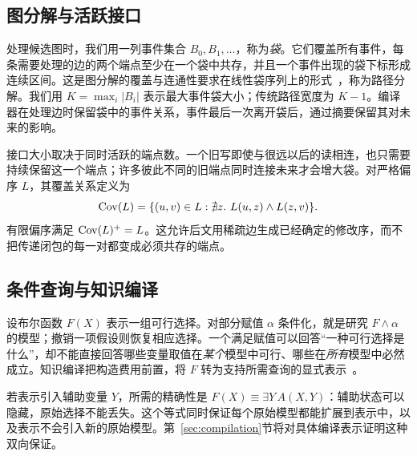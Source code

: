 \subsection{图分解与活跃接口}
处理候选图时，我们用一列事件集合 $B_0,B_1,\ldots$，称为\emph{袋}。它们覆盖所有事件，每条需要处理的边的两个端点至少在一个袋中共存，并且一个事件出现的袋下标形成连续区间。这是图分解的覆盖与连通性要求在线性袋序列上的形式~\cite[§3.1]{conrado2026}，称为路径分解。我们用 $K=\max_i|B_i|$ 表示最大事件袋大小；传统路径宽度为 $K-1$。编译器在处理边时保留袋中的事件关系，事件最后一次离开袋后，通过摘要保留其对未来的影响。

接口大小取决于同时活跃的端点数。一个旧写即使与很远以后的读相连，也只需要持续保留这一个端点；许多彼此不同的旧端点同时连接未来才会增大袋。对严格偏序 $L$，其覆盖关系定义为
\[
 \Cov(L)=\{(u,v)\in L:\nexists z.\ L(u,z)\land L(z,v)\}.
\]
有限偏序满足 $\operatorname{Cov}(L)^+=L$。这允许后文用稀疏边生成已经确定的修改序，而不把传递闭包的每一对都变成必须共存的端点。

\subsection{条件查询与知识编译}
设布尔函数 $F(X)$ 表示一组可行选择。对部分赋值 $\alpha$ 条件化，就是研究 $F\land\alpha$ 的模型；撤销一项假设则恢复相应选择。一个满足赋值可以回答“一种可行选择是什么”，却不能直接回答哪些变量取值在\emph{某个}模型中可行、哪些在\emph{所有}模型中必然成立。知识编译把构造费用前置，将 $F$ 转为支持所需查询的显式表示~\cite{darwiche2002}。

若表示引入辅助变量 $Y$，所需的精确性是 $F(X)\equiv\exists Y\,A(X,Y)$：辅助状态可以隐藏，原始选择不能丢失。这个等式同时保证每个原始模型都能扩展到表示中，以及表示不会引入新的原始模型。第~\ref{sec:compilation}节将对具体编译表示证明这种双向保证。
